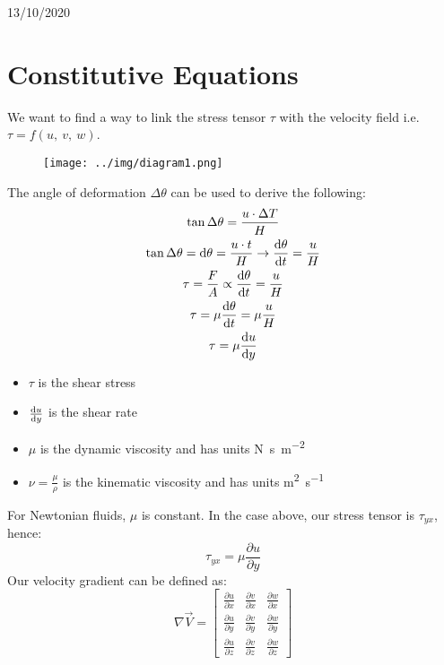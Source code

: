 \documentclass[class=report, crop=false, 12pt,a4paper]{standalone}
\begin{document}
\begin{center}
    13/10/2020
\end{center}
\section{Constitutive Equations}
We want to find a way to link the stress tensor $\tau$ with the velocity field i.e. $\tau = f(u, \ v, \ w)$.
\begin{figure}[H]
  \centering
  \texttt{[image: ../img/diagram1.png]}
\end{figure}
The angle of deformation $\Delta \theta$ can be used to derive the following:
\begin{gather}
  \tan{\Delta \theta} = \frac{u \cdot \Delta T}{H}\\
  \tan{\Delta \theta} = \dif \theta = \frac{u\cdot t}{H} \rightarrow \frac{\dif \theta}{\dif t} = \frac{u}{H}\\
  \tau = \frac{F}{A} \propto \frac{\dif \theta}{\dif t} = \frac{u}{H}\\
  \tau = \mu \frac{\dif \theta}{\dif t} = \mu \frac{u}{H}\\
  \tau = \mu \frac{\dif u}{\dif y}
\end{gather}
\begin{itemize}
  \item $\tau$ is the shear stress
  \item $\frac{\dif u}{\dif y}$ is the shear rate
  \item $\mu$ is the dynamic viscosity and has units \si{\newton\second\per\meter\squared}
  \item $\nu = \frac{\mu}{\rho}$ is the kinematic viscosity and has units \si{\meter\squared\per\second}
\end{itemize}
For Newtonian fluids, $\mu$ is constant. In the case above, our stress tensor is $\tau_{yx}$, hence:
\begin{equation}
  \tau_{yx} = \mu \frac{\partial u}{\partial y}
\end{equation}
Our velocity gradient can be defined as:
\begin{equation}
  \nabla \vec{V} = \begin{bmatrix}
    \frac{\partial u}{\partial x} & \frac{\partial v}{\partial x} & \frac{\partial w}{\partial x}\\
    \frac{\partial u}{\partial y} & \frac{\partial v}{\partial y} & \frac{\partial w}{\partial y}\\
    \frac{\partial u}{\partial z} & \frac{\partial v}{\partial z} & \frac{\partial w}{\partial z}
  \end{bmatrix}
\end{equation}
\end{document}
